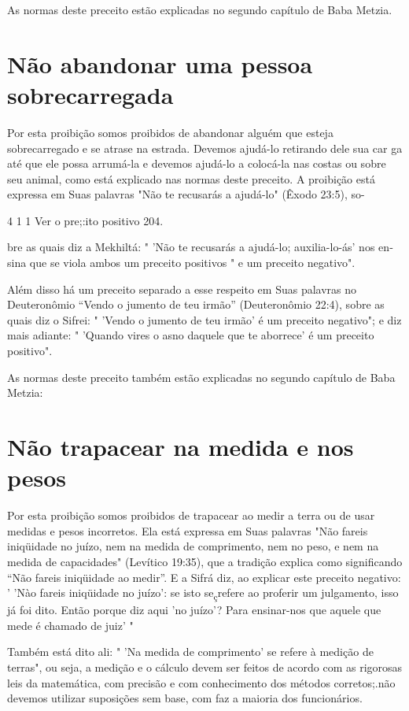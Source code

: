 As normas deste preceito estão explicadas no segundo capítulo de Baba
Metzia.

\section{Não abandonar uma pessoa sobrecarregada}

Por esta proibição somos proibidos de abandonar alguém que esteja
sobrecarregado e se atrase na estrada. Devemos ajudá-lo retirando dele
sua car ga até que ele possa arrumá-la e devemos ajudá-lo a colocá-la
nas costas ou so­bre seu animal, como está explicado nas normas deste
preceito. A proibição está expressa em Suas palavras "Não te recusarás a
ajudá-lo" (Êxodo 23:5), so-

4 1 1 Ver o pre;:ito positivo 204.

bre as quais diz a Mekhiltá: " 'Não te recusarás a ajudá-lo;
auxilia-lo-ás' nos en­sina que se viola ambos um preceito positivos " e
um preceito negativo".

Além disso há um preceito separado a esse respeito em Suas pala­vras no
Deuteronômio ``Vendo o jumento de teu irmão'' (Deuteronômio 22:4), sobre
as quais diz o Sifrei: " 'Vendo o jumento de teu irmão' é um preceito
negativo"; e diz mais adiante: " 'Quando vires o asno daquele que te
aborrece' é um preceito positivo".

As normas deste preceito também estão explicadas no segundo ca­pítulo de
Baba Metzia:

\section{Não trapacear na medida e nos pesos}

Por esta proibição somos proibidos de trapacear ao medir a terra ou de
usar medidas e pesos incorretos. Ela está expressa em Suas palavras "Não
fareis iniqüidade no juízo, nem na medida de comprimento, nem no peso, e
nem na medida de capacidades" (Levítico 19:35), que a tradição explica
como significando ``Não fareis iniqüidade ao medir''. E a Sifrá diz, ao
explicar este preceito negativo: ' 'Nào fareis iniqüidade no juízo': se
isto se\textsubscript{ç}refere ao profe­rir um julgamento, isso já foi
dito. Então porque diz aqui 'no juízo'? Para ensinar-nos que aquele que
mede é chamado de juiz' "

Também está dito ali: " 'Na medida de comprimento' se refere à me­dição
de terras", ou seja, a medição e o cálculo devem ser feitos de acordo
com as rigorosas leis da matemática, com precisão e com conhecimento dos
méto­dos corretos;.não devemos utilizar suposições sem base, com faz a
maioria dos funcionários.

